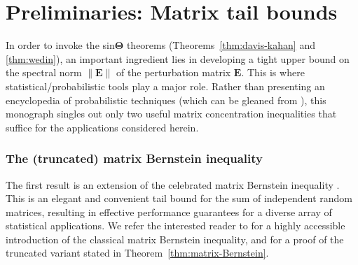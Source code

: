 \section{Preliminaries: Matrix tail bounds}
\label{sec:matrix-Bernstein}

In order to invoke the sin$\bm{\Theta}$ theorems (Theorems~\ref{thm:davis-kahan} and \ref{thm:wedin}), an important ingredient lies in developing a tight upper bound on the spectral norm $\|\bm{E}\|$ of the perturbation matrix $\bm{E}$. This is where statistical/probabilistic tools play a major role.
Rather than presenting an encyclopedia of probabilistic techniques (which can be gleaned from \citet{tropp2015introduction,vershynin2016high,boucheron2013concentration,wainwright2019high,tropp2011freedman,raginsky2013concentration,howard2020time}), this monograph singles out only two useful matrix concentration inequalities that suffice for the applications considered herein.


\subsubsection{The (truncated) matrix Bernstein inequality}
The first result is an extension of the celebrated matrix Bernstein inequality \citep{oliveira2009concentration, tropp2012user,hopkins2016fast}. 
This is an elegant and convenient tail bound for the sum of independent random matrices, resulting in effective performance guarantees for a diverse array of statistical applications.   We refer the interested reader to \citet{tropp2015introduction} for a highly accessible introduction of the classical matrix Bernstein inequality,
and \citet[Section~A.2.2]{hopkins2016fast} for a proof of the truncated variant stated in Theorem~\ref{thm:matrix-Bernstein}.

